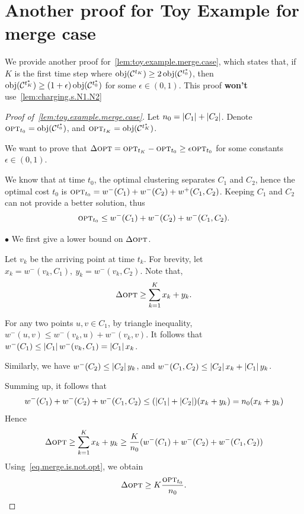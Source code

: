 \section{Another proof for Toy Example for merge case}\label{sec:another_proof_for_toy_example_for_merge_case} %

We provide another proof for~\cref{lem:toy.example.merge.case}, which states that, if $ K $ is the first time step where $\obj(\solcls{K}) \ge 2\,\obj(\optcls{0})$, then $\obj(\optcls{K}) \ge (1+\epsilon)\,\obj(\optcls{0})$ for some $\epsilon \in (0,1)$. This proof \textbf{won't} use~\cref{lem:charging.s.N1.N2}

\begin{proof}[Proof of~\cref{lem:toy.example.merge.case}]
    Let $ n_{0} = \left| C_{1} \right| + \left| C_{2} \right| $. Denote $ \OPT_{t_0} = \obj(\optcls{0}) $, and $ \OPT_{t_{K}} = \obj(\optcls{K}) $.

    We want to prove that $ \Delta{\textsc{opt}} = \textsc{opt}_{t_{K}} - \textsc{opt}_{t_{0}} \geq \epsilon \textsc{opt}_{t_{0}} $ for some constants $ \epsilon\in (0,1) $.

    We know that at time $ t_{0} $, the optimal clustering separates $ C_{1} $ and $ C_{2} $, hence the optimal cost $ t_{0} $ is $ \textsc{opt}_{t_0} = w^{-}(C_1) + w^{-}(C_{2}) + w^{+}(C_{1}, C_{2}) $.
    Keeping $ C_{1} $ and $ C_{2} $ can not provide a better solution, thus
    \begin{align}
        \textsc{opt}_{t_0} \le w^{-}(C_1) + w^{-}(C_{2}) + w^{-}(C_{1}, C_{2}). \label{eq.merge.is.not.opt}
    \end{align}

    $ \bullet $ We first give a lower bound on $ \Delta{\textsc{opt}} $.

    Let $ v_{k} $ be the arriving point at time $ t_{k} $.
    For brevity, let $ x_{k} = w^{-}(v_{k}, C_{1}),\ y_{k} = w^{-}(v_{k}, C_{2}) $.
    Note that,
    \begin{align}
        \Delta\textsc{opt} \ge \sum_{k=1}^{K} x_k + y_k. \label{eq.upper.xk.yk}
    \end{align}

    For any two points $ u,v\in C_{1} $, by triangle inequality, $ w^{-}(u,v) \le w^{-}(v_{k}, u) + w^{-}(v_{k}, v) $. It follows that $ w^{-}(C_{1}) \le \left| C_{1} \right|w^{-}(v_{k}, C_{1}) = \left| C_{1} \right|x_{k} $.

    Similarly, we have $ w^{-}(C_{2}) \le \left| C_{2} \right|y_{k} $, and $ w^{-}(C_{1}, C_{2}) \le \left| C_{2} \right|x_{k} + \left| C_{1} \right|y_{k} $.

    Summing up, it follows that
    \[ w^{-}(C_{1}) + w^{-}(C_{2}) + w^{-}(C_{1}, C_{2})\leq (\left| C_1 \right|+\left| C_2 \right|)(x_{k}+y_{k}) = n_{0}(x_{k} + y_{k}) \]
    Hence
    \begin{align}
        \Delta\textsc{opt} \geq \sum_{k=1}^{K}x_{k} + y_{k}\ge \dfrac{K}{n_0}(w^{-}(C_{1}) + w^{-}(C_{2}) + w^{-}(C_{1}, C_{2})) 
    \end{align}
    Using~\eqref{eq.merge.is.not.opt}, we obtain
    \begin{align}
        \Delta\textsc{opt} \geq K \dfrac{\textsc{opt}_{t_0}}{n_0}.\label{eq.lowerbound.Delta.OPT}
    \end{align}


\end{proof}
